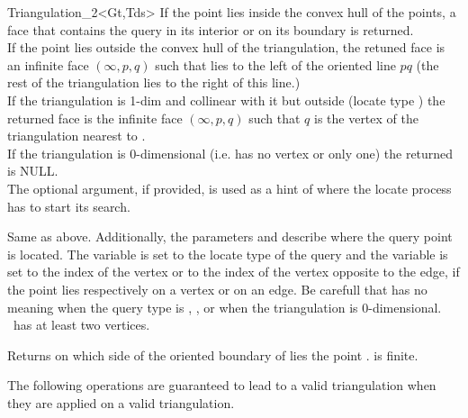 \begin{ccClassTemplate}{Triangulation_2<Gt,Tds>}
{If the point  lies inside the convex hull of the points, a face 
that contains the query in its interior or on its
 boundary is returned.\\
If the point  lies outside the convex hull of the
triangulation,
the retuned face is
an infinite face $(\infty, p, q)$ such that
 lies to the left  of the oriented line $pq$ 
(the rest of the triangulation lies to the right of this line.) \\
If the triangulation is 1-dim and 
 collinear with it but outside (locate type
) 
 the returned face is the infinite face $(\infty, p, q)$
such that $q$ is the vertex of the triangulation
nearest to . \\
If the triangulation is $0$-dimensional (i.e. has no vertex or only
one) the returned  is NULL. \\
The optional  argument, if provided, is used as a hint
of where the locate process has to start its search.}




{Same as above. Additionally, the parameters 
 and 
describe where the query point is located. 
The variable  is set to the locate type of the query and
the variable 
is set to the index of the vertex or to the index 
of the vertex opposite to the
edge, if the point lies respectively on a vertex or on an edge. 
Be carefull that 
has no meaning when the query type is , , 
 or when the
triangulation is $0$-dimensional.
\ccPrecond \ccVar\ has at least two vertices.}

{Returns on which side of the oriented boundary of  lies 
the point . \ccPrecond {} is finite.}


The following operations are guaranteed to lead to a valid triangulation 
when they are applied on a valid triangulation.





\end{ccClassTemplate}
